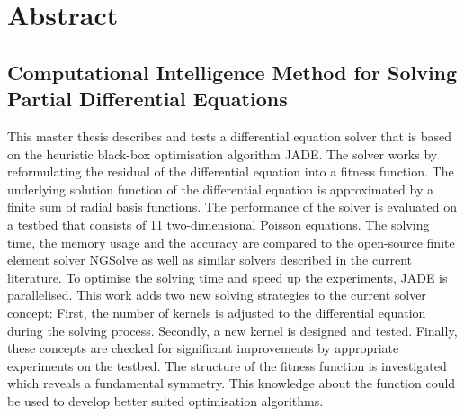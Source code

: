 \documentclass[./\jobname.tex]{subfiles}
\begin{document}
\chapter*{Abstract}
\section*{Computational Intelligence Method for Solving Partial Differential Equations}
%
This master thesis describes and tests a differential equation solver that is based on the heuristic black-box optimisation algorithm JADE. The solver works by reformulating the residual of the differential equation into a fitness function. The underlying solution function of the differential equation is approximated by a finite sum of radial basis functions. The performance of the solver is evaluated on a testbed that consists of 11 two-dimensional Poisson equations. The solving time, the memory usage and the accuracy are compared to the open-source finite element solver NGSolve as well as similar solvers described in the current literature. To optimise the solving time and speed up the experiments, JADE is parallelised. This work adds two new solving strategies to the current solver concept: First, the number of kernels is adjusted to the differential equation during the solving process. Secondly, a new kernel is designed and tested. Finally, these concepts are checked for significant improvements by appropriate experiments on the testbed. The structure of the fitness function is investigated which reveals a fundamental symmetry. This knowledge about the function could be used to develop better suited optimisation algorithms. 
%
\end{document}
